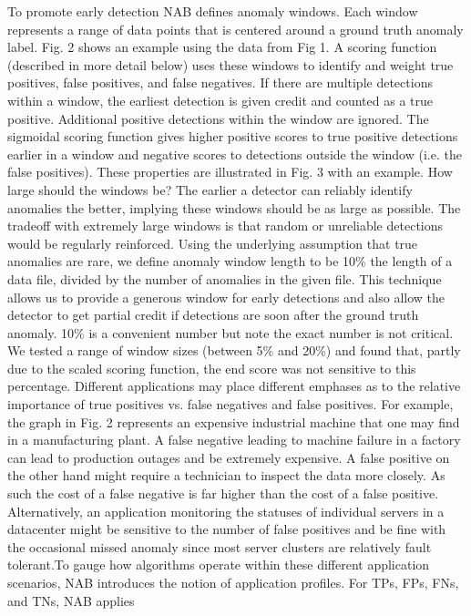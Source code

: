 \documentclass[12pt]{article}
\begin{document}
To promote early detection NAB defines anomaly
windows. Each window represents a range of data points that is
centered around a ground truth anomaly label. Fig. 2 shows an
example using the data from Fig 1. A scoring function
(described in more detail below) uses these windows to
identify and weight true positives, false positives, and false
negatives. If there are multiple detections within a window, the
earliest detection is given credit and counted as a true positive.
Additional positive detections within the window are ignored.
The sigmoidal scoring function gives higher positive scores to
true positive detections earlier in a window and negative scores
to detections outside the window (i.e. the false positives).
These properties are illustrated in Fig. 3 with an example.
How large should the windows be? The earlier a detector
can reliably identify anomalies the better, implying these
windows should be as large as possible. The tradeoff with
extremely large windows is that random or unreliable
detections would be regularly reinforced. Using the underlying
assumption that true anomalies are rare, we define anomaly
window length to be 10\% the length of a data file, divided by
the number of anomalies in the given file. This technique
allows us to provide a generous window for early detections
and also allow the detector to get partial credit if detections are
soon after the ground truth anomaly. 10\% is a convenient
number but note the exact number is not critical. We tested a
range of window sizes (between 5\% and 20\%) and found that,
partly due to the scaled scoring function, the end score was not
sensitive to this percentage. Different applications may place different emphases as to
the relative importance of true positives vs. false negatives and
false positives. For example, the graph in Fig. 2 represents an
expensive industrial machine that one may find in a
manufacturing plant. A false negative leading to machine
failure in a factory can lead to production outages and be
extremely expensive. A false positive on the other hand might
require a technician to inspect the data more closely. As such
the cost of a false negative is far higher than the cost of a false
positive. Alternatively, an application monitoring the statuses
of individual servers in a datacenter might be sensitive to the
number of false positives and be fine with the occasional
missed anomaly since most server clusters are relatively fault
tolerant.To gauge how algorithms operate within these different
application scenarios, NAB introduces the notion of
application profiles. For TPs, FPs, FNs, and TNs, NAB applies
\end{document}
